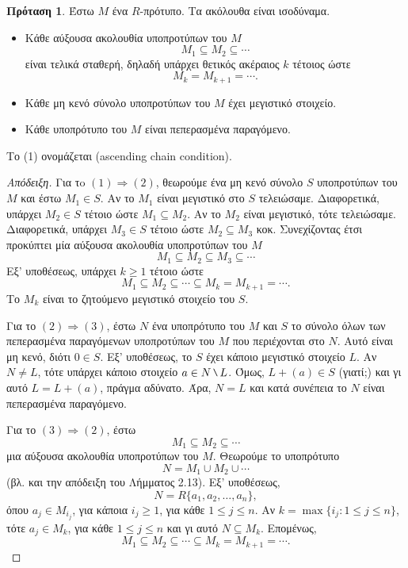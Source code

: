 \documentclass[12pt,a4paper,reqno]{amsart}
\theoremstyle{definition}
\newtheorem{proposition}[theorem]{Πρόταση}
\theoremstyle{remark}
\numberwithin{theorem}{section}
\numberwithin{exercise}{section}
\numberwithin{equation}{section}
\newcommand{\then}{\Rightarrow}
\newcommand{\mysetminusD}{\hbox{\tikz{\draw[line width=0.6pt,line cap=round] (3pt,0) -- (0,6pt);}}}
\newcommand{\mysetminusT}{\mysetminusD}
\newcommand{\mysetminusS}{\hbox{\tikz{\draw[line width=0.45pt,line cap=round] (2pt,0) -- (0,4pt);}}}
\newcommand{\mysetminusSS}{\hbox{\tikz{\draw[line width=0.4pt,line cap=round] (1.5pt,0) -- (0,3pt);}}}
\newcommand{\sm}{\mathbin{\mathchoice{\mysetminusD}{\mysetminusT}{\mysetminusS}{\mysetminusSS}}}
\newcommand{\defn}[1]{{\color{mylightblue}{#1}}}
\begin{document}
\begin{proposition}
    \label{prop:noetherian}
    Έστω $M$ ένα $R$-πρότυπο. Τα ακόλουθα είναι ισοδύναμα.
    \begin{itemize}
        \item[(1)] Κάθε αύξουσα ακολουθία υποπροτύπων του $M$
        \[
        M_1 \subseteq M_2 \subseteq \cdots 
        \]
        είναι τελικά σταθερή, δηλαδή υπάρχει θετικός ακέραιος $k$ τέτοιος ώστε 
        \[
        M_k = M_{k+1} = \cdots.
        \]
        \item[(2)] Κάθε μη κενό σύνολο υποπροτύπων του $M$ έχει μεγιστικό στοιχείο.
        \item[(3)] Κάθε υποπρότυπο του $M$ είναι πεπερασμένα παραγόμενο.
    \end{itemize}
    Το (1) ονομάζεται \defn{συνθήκη αύξουσας αλυσίδας} (ascending chain condition).
\end{proposition}
\begin{proof}[Απόδειξη]
    Για τo $(1) \then (2)$, θεωρούμε ένα μη κενό σύνολο $S$ υποπροτύπων του $M$ και έστω $M_1 \in S$. Αν το $M_1$ είναι μεγιστικό στο $S$ τελειώσαμε. Διαφορετικά, υπάρχει $M_2 \in S$ τέτοιο ώστε $M_1 \subseteq M_2$. Αν το $M_2$ είναι μεγιστικό, τότε τελειώσαμε. Διαφορετικά, υπάρχει $M_3 \in S$ τέτοιο ώστε $M_2 \subseteq M_3$ κοκ. Συνεχίζοντας έτσι προκύπτει μία αύξουσα ακολουθία υποπροτύπων του $M$ 
    \[
    M_1 \subseteq M_2 \subseteq M_3 \subseteq \cdots  
    \]
    Εξ' υποθέσεως, υπάρχει $k \ge 1$ τέτοιο ώστε 
    \[
    M_1 \subseteq M_2 \subseteq \cdots \subseteq M_k = M_{k+1} = \cdots. 
    \]
    Το $M_k$ είναι το ζητούμενο μεγιστικό στοιχείο του $S$.

    Για το $(2) \then (3)$, έστω $N$ ένα υποπρότυπο του $M$ και $S$ το σύνολο όλων των πεπερασμένα παραγόμενων υποπροτύπων του $M$ που περιέχονται στο $N$. Αυτό είναι μη κενό, διότι $0 \in S$. Εξ' υποθέσεως, το $S$ έχει κάποιο μεγιστικό στοιχείο $L$. Αν $N \neq L$, τότε υπάρχει κάποιο στοιχείο $a \in N \sm L$. Όμως, $L + (a) \in S$ (γιατί;) και γι αυτό $L = L + (a)$, πράγμα αδύνατο. Άρα, $N = L$ και κατά συνέπεια το $N$ είναι πεπερασμένα παραγόμενο.

    Για το $(3) \then (2)$, έστω 
    \[
    M_1 \subseteq M_2 \subseteq \cdots 
    \]
    μια αύξουσα ακολουθία υποπροτύπων του $M$. Θεωρούμε το υποπρότυπο 
    \[
    N = M_1 \cup M_2 \cup \cdots
    \]
    (βλ. και την απόδειξη του Λήμματος 2.13). Εξ' υποθέσεως, 
    \[
    N = R\{a_1, a_2, \dots, a_n\},
    \]
    όπου $a_j \in M_{i_j}$, για κάποια $i_j \ge 1$, για κάθε $1 \le j \le n$. Αν $k = \max\{i_j : 1\le j \le n\}$, τότε $a_j \in M_k$, για κάθε $1 \le j \le n$ και γι αυτό $N \subseteq M_k$. Επομένως, 
    \[
    M_1 \subseteq M_2 \subseteq \cdots \subseteq M_k = M_{k+1} = \cdots.
    \]
\end{proof} 
\end{document}
